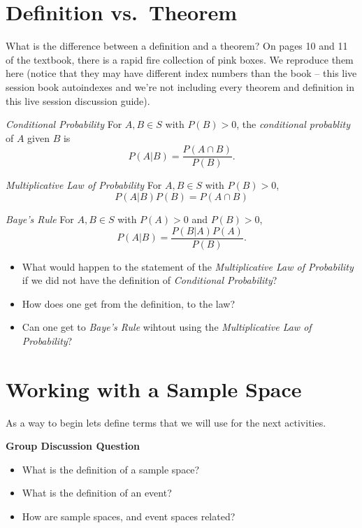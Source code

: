 \documentclass[
  letterpaper,
  DIV=11,
  numbers=noendperiod]{scrreprt}
\providecommand{\tightlist}{%
  \setlength{\itemsep}{0pt}\setlength{\parskip}{0pt}}\usepackage{longtable,booktabs,array}
\begin{document}
\section{Definition vs.~Theorem}\label{definition-vs.-theorem}

What is the difference between a definition and a theorem? On pages 10
and 11 of the textbook, there is a rapid fire collection of pink boxes.
We reproduce them here (notice that they may have different index
numbers than the book -- this live session book autoindexes and we're
not including every theorem and definition in this live session
discussion guide).

\emph{Conditional Probability} For \(A, B \in S\) with \(P(B) > 0\), the
\emph{conditional probablity} of \(A\) given \(B\) is
\[P(A|B) = \frac{P(A\cap B)}{P(B)}.\]

\emph{Multiplicative Law of Probability} For \(A, B \in S\) with
\(P(B) > 0\), \[P(A|B)P(B) = P(A \cap B)\]

\emph{Baye's Rule} For \(A, B \in S\) with \(P(A) > 0\) and
\(P(B) > 0\), \[P(A|B) = \frac{P(B|A)P(A)}{P(B)}.\]

\begin{itemize}
\tightlist
\item
  What would happen to the statement of the \emph{Multiplicative Law of
  Probability} if we did not have the definition of \emph{Conditional
  Probability}?
\item
  How does one get from the definition, to the law?
\item
  Can one get to \emph{Baye's Rule} wihtout using the
  \emph{Multiplicative Law of Probability}?
\end{itemize}

\section{Working with a Sample Space}\label{working-with-a-sample-space}

As a way to begin lets define terms that we will use for the next
activities.

\textbf{Group Discussion Question}

\begin{itemize}
\tightlist
\item
  What is the definition of a sample space?
\item
  What is the definition of an event?
\item
  How are sample spaces, and event spaces related?
\end{itemize}
\end{document}
